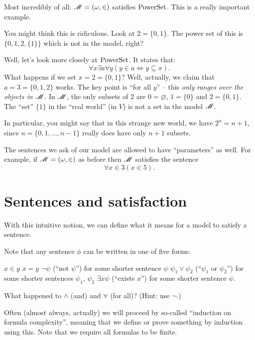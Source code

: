 \begin{example}
	Most incredibly of all: $\mathscr M = (\omega, \in)$ satisfies $\mathrm{PowerSet}$.
	This is a really important example.
	
	You might think this is ridiculous. Look at $2 = \{0,1\}$.
	The power set of this is $\{0, 1, 2, \{1\}\}$ which is not in the model, right?

	Well, let's look more closely at $\mathrm{PowerSet}$. It states that:
	\[ \forall x \exists a \forall y (y \in a \iff y \subseteq x). \]
	What happens if we set $x = 2 = \{0,1\}$?
	Well, actually, we claim that $a = 3 = \{0,1,2\}$ works.
	The key point is ``for all $y$'' -- this \emph{only ranges over the objects in $\mathscr M$}.
	In $\mathscr M$, the only subsets of $2$ are $0 = \varnothing$,
	$1 = \{0\}$ and $2 = \{0,1\}$.
	The ``set'' $\{1\}$ in the ``real world'' (in $V$) is not a set in the model $\mathscr M$.

	In particular, you might say that in this strange new world,
	we have $2^n = n+1$, since $n = \{0,1,\dots,n-1\}$ really does
	have only $n+1$ subsets.
\end{example}

\begin{example}
	The sentences we ask of our model are allowed to have ``parameters'' as well.
	For example, if $\mathscr M = (\omega, \in)$ as before then $\mathscr M$ satisfies the sentence
	\[ \forall x \in 3 (x \in 5). \]
\end{example}

\section{Sentences and satisfaction}
With this intuitive notion, we can define what it means for a model to satisfy a sentence.
\begin{definition}
Note that any sentence $\phi$ can be written in one of five forms:
\begin{itemize}
	\ii $x \in y$
	\ii $x = y$
	\ii $\neg \psi$ (``not $\psi$'') for some shorter sentence $\psi$
	\ii $\psi_1 \lor \psi_2$ (``$\psi_1$ or $\psi_2$'')
	for some shorter sentences $\psi_1$, $\psi_2$
	\ii $\exists x \psi$ (``exists $x$'') for some shorter sentence $\psi$.
\end{itemize}
\end{definition}
\begin{ques}
	What happened to $\land$ (and) and $\forall$ (for all)?
	(Hint: use $\neg$.)
\end{ques}
Often (almost always, actually) we will proceed by so-called ``induction on formula complexity'',
meaning that we define or prove something by induction using this.
Note that we require all formulas to be finite.


